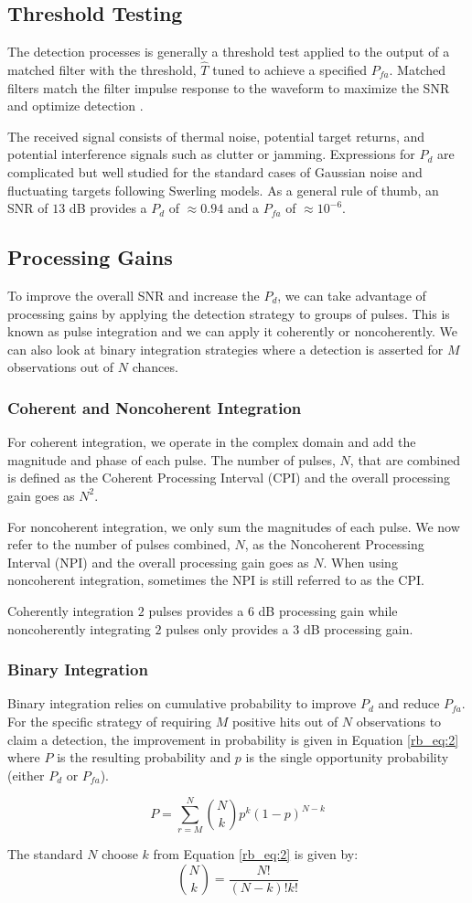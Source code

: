 \subsection{Threshold Testing}
The detection processes is generally a threshold test applied to the output of a matched filter with the threshold, $\hat{T}$ tuned to achieve a specified $P_{fa}$. Matched filters match the filter impulse response to the waveform to maximize the SNR and optimize detection \cite{richards_dsp}. 

The received signal consists of thermal noise, potential target returns, and potential interference signals such as clutter or jamming. Expressions for $P_d$ are complicated but well studied for the standard cases of Gaussian noise and fluctuating targets following Swerling models. As a general rule of thumb, an SNR of $13$ dB provides a $P_d$ of $\approx 0.94$ and a $P_{fa}$ of $\approx 10^{-6}$.

\subsection{Processing Gains}
To improve the overall SNR and increase the $P_d$, we can take advantage of processing gains by applying the detection strategy to groups of pulses. This is known as pulse integration and we can apply it coherently or noncoherently. We can also look at binary integration strategies where a detection is asserted for $M$ observations out of $N$ chances.

\subsubsection{Coherent and Noncoherent Integration}
For coherent integration, we operate in the complex domain and add the magnitude and phase of each pulse. The number of pulses, $N$, that are combined is defined as the Coherent Processing Interval (CPI) and the overall processing gain goes as $N^2$.

For noncoherent integration, we only sum the magnitudes of each pulse. We now refer to the number of pulses combined, $N$, as the Noncoherent Processing Interval (NPI) and the overall processing gain goes as $N$. When using noncoherent integration, sometimes the NPI is still referred to as the CPI.

Coherently integration $2$ pulses provides a $6$ dB processing gain while noncoherently integrating $2$ pulses only provides a $3$ dB processing gain.

\subsubsection{Binary Integration}
Binary integration relies on cumulative probability to improve $P_d$ and reduce $P_{fa}$. For the specific strategy of requiring $M$ positive hits out of $N$ observations to claim a detection, the improvement in probability is given in Equation \ref{rb_eq:2} where $P$ is the resulting probability and $p$ is the single opportunity probability (either $P_d$ or $P_{fa}$). 

\begin{equation}
\label{rb_eq:2}
P = \sum_{r=M}^N\binom{N}{k}p^k\left(1-p \right)^{N-k}
\end{equation}

The standard $N$ choose $k$ from Equation \ref{rb_eq:2} is given by:
\begin{equation}
\label{rb_eq:3}
\binom{N}{k} = \frac{N!}{(N-k)!k!}
\end{equation}